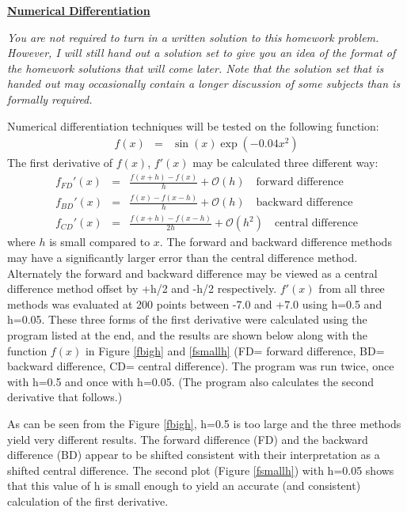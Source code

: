 \documentclass[11pt,letterpaper]{article}
\begin{document}
\begin{center}
\underline{\bf \large Numerical Differentiation }
\end{center}

{\em
    You are not required to turn in a written solution to this homework problem.  
However, I will still hand out a solution set to give you an idea of the format of the 
homework solutions that will come later.  Note that the solution set that is handed out 
may occasionally contain a longer discussion of some subjects than is formally required.
}

Numerical differentiation techniques will be tested on the following function:
\begin{eqnarray}
f(x) & = & \sin(x) \exp ( -0.04x^2 )
\end{eqnarray}
The first derivative of $f(x)$, $f'(x)$ may be calculated three different way:
\begin{eqnarray}
f_{FD}'(x) & = & \frac{ f(x+h) - f(x) }{h} + \mathcal{O}(h) \mbox{~~~forward difference} \\
f_{BD}'(x) & = & \frac{ f(x) - f(x-h) }{h} + \mathcal{O}(h)  \mbox{~~~backward difference} \\
f_{CD}'(x) & = & \frac{ f(x+h) - f(x-h) }{2h} + \mathcal{O}(h^2) 
                \mbox{~~~central difference} 
\end{eqnarray}
where $h$ is small compared to $x$. The forward and backward difference methods may have 
a significantly larger error than the central difference method.  Alternately the forward and 
backward difference may be viewed as a central difference method offset by 
+h/2 and -h/2 respectively.  $f'(x)$ from all three methods was evaluated at 200 points 
between -7.0 and +7.0  using h=0.5 and h=0.05.  These three forms of the first derivative 
were calculated using the program listed at the end, and the results are shown
below along with the function $f(x)$ in Figure \ref{fbigh} and \ref{fsmallh} 
(FD= forward difference,  BD= 
backward difference, CD= central difference). The program was run twice, once with 
h=0.5 and once with h=0.05.  (The program also calculates the second derivative that 
follows.)

As can be seen from the Figure \ref{fbigh},  h=0.5 is too large and the three methods yield very 
different results.  The forward difference (FD) and the backward difference (BD)
appear to be shifted consistent with their interpretation as a shifted central difference.  
The second plot (Figure \ref{fsmallh}) with h=0.05 shows that this value of h is small
enough to yield an accurate (and consistent) calculation of the first derivative.
\end{document}
